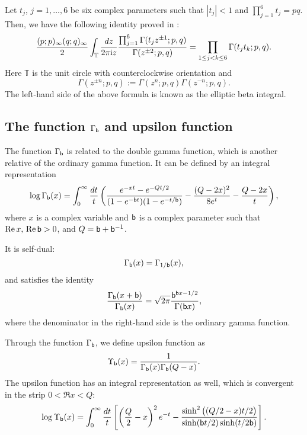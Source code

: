 Let $t_j$, $j=1,\ldots,6$ be six complex parameters such that $|t_j|<1$ and $\prod_{j=1}^6 t_j=pq$.
Then, we have the following identity proved in \cite{MR1846786}:
\begin{equation}
    \frac{(p;p)_{\infty} (q;q)_{\infty}}{2}
        \int_{\mathbb T}\frac{dz}{2\pi\mathrm{i} z} \frac{\prod_{j=1}^6\Gamma(t_j z^{\pm 1};p,q)}{\Gamma(z^{\pm 2};p,q)}
            =\prod_{1\leq j<k \leq 6} \Gamma(t_j t_k;p,q).
\end{equation}
Here ${\mathbb T}$ is the unit circle with counterclockwise orientation and
\begin{equation}
    \Gamma(z^{\pm n};p,q) := \Gamma(z^{n};p,q) \Gamma(z^{-n};p,q).
\end{equation}
The left-hand side of the above formula is known as the elliptic beta integral.





\subsection{The function $\Gamma_{\mathsf{b}}$ and upsilon function}

The function $\Gamma_{\mathsf{b}}$ is related to the double gamma function,
which is another relative of the ordinary gamma function.
It can be defined by an integral representation
\begin{equation}
    \log \Gamma_{\mathsf{b}}(x) =\int_0^{\infty}
        \frac{dt}{t}\left( \frac{e^{-xt}-e^{-Qt/2}}{(1-e^{-\mathsf{b} t})(1-e^{-t/\mathsf{b}})}
            -\frac{(Q-2x)^2}{8e^t} -\frac{Q-2x}{t} \right),
\end{equation}
where $x$ is a complex variable and $\mathsf{b}$ is a complex parameter such that $\mathop{\mathrm{Re}}\nolimits x,\,\mathop{\mathrm{Re}}\nolimits \mathsf{b} >0$,
and $Q=\mathsf{b} + \mathsf{b}^{-1}$.

It is self-dual:
\begin{equation}
    \Gamma_{\mathsf{b}}(x) = \Gamma_{1/\mathsf{b}}(x),
\end{equation}
and satisfies the identity
\begin{equation}
    \frac{\Gamma_{\mathsf{b}}(x+\mathsf{b})}{\Gamma_{\mathsf{b}}(x)}
        = \sqrt{2\pi} \frac{\mathsf{b}^{\mathsf{b} x-1/2}}{\Gamma(\mathsf{b} x)},
\end{equation}
where the denominator in the right-hand side is the ordinary gamma function.

Through the function $\Gamma_{\mathsf{b}}$, we define upsilon function as
\begin{equation}
    \Upsilon_{\mathsf{b}}(x) = \frac{1}{\Gamma_{\mathsf{b}}(x) \Gamma_{\mathsf{b}}(Q-x)}.
\end{equation}
The upsilon function has an integral representation as well, which is convergent in the
strip $0<\Re x<Q$:
\begin{equation}
    \log \Upsilon_{\mathsf{b}}(x) =\int_0^{\infty}
    \frac{dt}{t}\left[ \left( \frac{Q}{2} -x \right)^2 e^{-t}
        - \frac{\sinh^2\big((Q/2-x)t/2\big)}{\sinh(\mathsf{b} t/2)\sinh(t/2\mathsf{b})} \right].
\end{equation}

